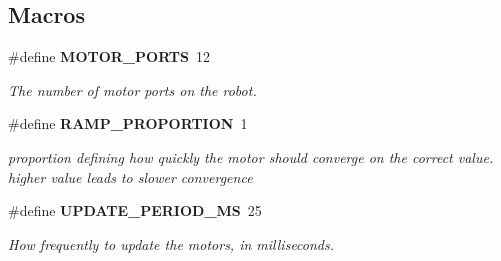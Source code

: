 \subsection*{Macros}
\begin{DoxyCompactItemize}
\item 
\#define \textbf{ M\+O\+T\+O\+R\+\_\+\+P\+O\+R\+TS}~12
\begin{DoxyCompactList}\small\item\em The number of motor ports on the robot. \end{DoxyCompactList}\item 
\#define \textbf{ R\+A\+M\+P\+\_\+\+P\+R\+O\+P\+O\+R\+T\+I\+ON}~1
\begin{DoxyCompactList}\small\item\em proportion defining how quickly the motor should converge on the correct value. higher value leads to slower convergence \end{DoxyCompactList}\item 
\#define \textbf{ U\+P\+D\+A\+T\+E\+\_\+\+P\+E\+R\+I\+O\+D\+\_\+\+MS}~25
\begin{DoxyCompactList}\small\item\em How frequently to update the motors, in milliseconds. \end{DoxyCompactList}\end{DoxyCompactItemize}
